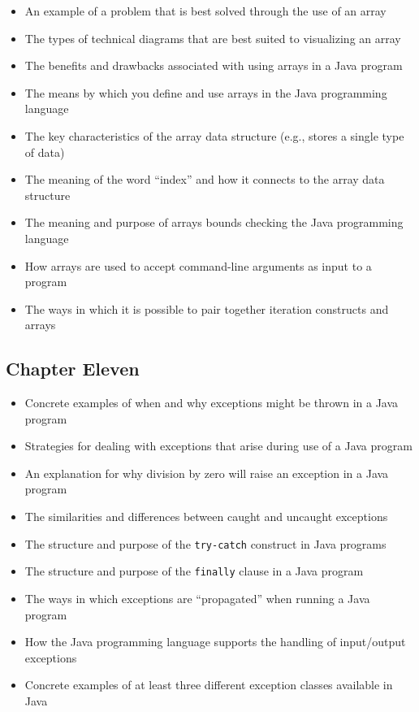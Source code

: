 \begin{itemize}

  \itemsep -.015in
  \item An example of a problem that is best solved through the use of an array
  \item The types of technical diagrams that are best suited to visualizing an array
  \item The benefits and drawbacks associated with using arrays in a Java program
  \item The means by which you define and use arrays in the Java programming language
  \item The key characteristics of the array data structure (e.g., stores a single type of data)
  \item The meaning of the word ``index'' and how it connects to the array data structure
  \item The meaning and purpose of arrays bounds checking the Java programming language
  \item How arrays are used to accept command-line arguments as input to a program
  \item The ways in which it is possible to pair together iteration constructs and arrays

\end{itemize}

\vspace*{-.2in}
\subsection*{Chapter Eleven}
\vspace*{-.05in}

\begin{itemize}

  \itemsep -.015in
  \item Concrete examples of when and why exceptions might be thrown in a Java program
  \item Strategies for dealing with exceptions that arise during use of a Java program
  \item An explanation for why division by zero will raise an exception in a Java program
  \item The similarities and differences between caught and uncaught exceptions
  \item The structure and purpose of the {\tt try-catch} construct in Java programs
  \item The structure and purpose of the {\tt finally} clause in a Java program
  \item The ways in which exceptions are ``propagated'' when running a Java program
  \item How the Java programming language supports the handling of input/output exceptions
  \item Concrete examples of at least three different exception classes available in Java

\end{itemize}

